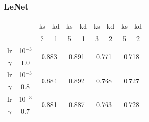 \documentclass[a4paper,12pt,twoside,titlepage]{article}
\begin{document}
\subsubsection*{LeNet}
\begin{table}[h!]
  \centering
  \begin{tabular}{|cc||cc|cc|cc|cc|}
  \hline
  \multicolumn{2}{|c||}{\multirow{2}{*}{}}    & \multicolumn{1}{c|}{ks}         & kd        & \multicolumn{1}{c|}{ks}         & kd        & \multicolumn{1}{c|}{ks}         & kd        & \multicolumn{1}{c|}{ks}         & kd        \\ \cline{3-10} 
  \multicolumn{2}{|c||}{}                     & \multicolumn{1}{c|}{3}          & 1         & \multicolumn{1}{c|}{5}          & 1         & \multicolumn{1}{c|}{3}          & 2         & \multicolumn{1}{c|}{5}          & 2         \\ \hline\hline
  \multicolumn{1}{|c|}{lr}       & 10$^{-3}$ & \multicolumn{2}{c|}{\multirow{2}{*}{0.883}} & \multicolumn{2}{c|}{\multirow{2}{*}{0.891}} & \multicolumn{2}{c|}{\multirow{2}{*}{0.771}} & \multicolumn{2}{c|}{\multirow{2}{*}{0.718}} \\ \cline{1-2}
  \multicolumn{1}{|c|}{$\gamma$} & 1.0       & \multicolumn{2}{c|}{}                       & \multicolumn{2}{c|}{}                       & \multicolumn{2}{c|}{}                       & \multicolumn{2}{c|}{}                       \\ \hline
  \multicolumn{1}{|c|}{lr}       & 10$^{-3}$ & \multicolumn{2}{c|}{\multirow{2}{*}{0.884}} & \multicolumn{2}{c|}{\multirow{2}{*}{0.892}} & \multicolumn{2}{c|}{\multirow{2}{*}{0.768}} & \multicolumn{2}{c|}{\multirow{2}{*}{0.727}} \\ \cline{1-2}
  \multicolumn{1}{|c|}{$\gamma$} & 0.8       & \multicolumn{2}{c|}{}                       & \multicolumn{2}{c|}{}                       & \multicolumn{2}{c|}{}                       & \multicolumn{2}{c|}{}                       \\ \hline
  \multicolumn{1}{|c|}{lr}       & 10$^{-3}$ & \multicolumn{2}{c|}{\multirow{2}{*}{0.881}} & \multicolumn{2}{c|}{\multirow{2}{*}{0.887}} & \multicolumn{2}{c|}{\multirow{2}{*}{0.763}} & \multicolumn{2}{c|}{\multirow{2}{*}{0.728}} \\ \cline{1-2}
  \multicolumn{1}{|c|}{$\gamma$} & 0.7       & \multicolumn{2}{c|}{}                       & \multicolumn{2}{c|}{}                       & \multicolumn{2}{c|}{}                       & \multicolumn{2}{c|}{}                       \\ \hline

\end{tabular}
\end{table}
\end{document}
